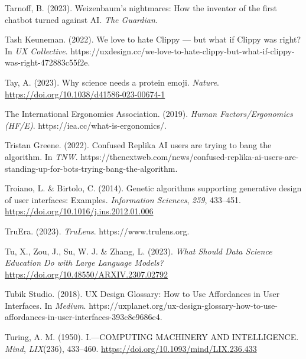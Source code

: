 \documentclass[
  letterpaper,
  DIV=11,
  numbers=noendperiod]{scrartcl}
\newlength{\cslhangindent}
\newenvironment{CSLReferences}[2] %
 {\begin{list}{}{%
  \setlength{\itemindent}{0pt}
  \setlength{\leftmargin}{0pt}
  \setlength{\parsep}{0pt}
  \ifodd #1
   \setlength{\leftmargin}{\cslhangindent}
   \setlength{\itemindent}{-1\cslhangindent}
  \fi
  \setlength{\itemsep}{#2\baselineskip}}}
 {\end{list}}
\begin{document}
\begin{CSLReferences}{1}{0}
Tarnoff, B. (2023). Weizenbaum's nightmares: How the inventor of the
first chatbot turned against {AI}. \emph{The Guardian}.

Tash Keuneman. (2022). We love to hate {Clippy} --- but what if {Clippy}
was right? In \emph{UX Collective}.
https://uxdesign.cc/we-love-to-hate-clippy-but-what-if-clippy-was-right-472883c55f2e.

Tay, A. (2023). Why science needs a protein emoji. \emph{Nature}.
\url{https://doi.org/10.1038/d41586-023-00674-1}

The International Ergonomics Association. (2019). \emph{Human
{Factors}/{Ergonomics} ({HF}/{E})}. https://iea.cc/what-is-ergonomics/.

Tristan Greene. (2022). Confused {Replika AI} users are trying to bang
the algorithm. In \emph{TNW}.
https://thenextweb.com/news/confused-replika-ai-users-are-standing-up-for-bots-trying-bang-the-algorithm.

Troiano, L. \& Birtolo, C. (2014). Genetic algorithms supporting
generative design of user interfaces: {Examples}. \emph{Information
Sciences}, \emph{259}, 433--451.
\url{https://doi.org/10.1016/j.ins.2012.01.006}

TruEra. (2023). \emph{{TruLens}}. https://www.trulens.org.

Tu, X., Zou, J., Su, W. J. \& Zhang, L. (2023). \emph{What {Should Data
Science Education Do} with {Large Language Models}?}
\url{https://doi.org/10.48550/ARXIV.2307.02792}

Tubik Studio. (2018). {UX Design Glossary}: {How} to {Use Affordances}
in {User Interfaces}. In \emph{Medium}.
https://uxplanet.org/ux-design-glossary-how-to-use-affordances-in-user-interfaces-393c8e9686e4.

Turing, A. M. (1950). I.---{COMPUTING MACHINERY AND INTELLIGENCE}.
\emph{Mind}, \emph{LIX}(236), 433--460.
\url{https://doi.org/10.1093/mind/LIX.236.433}


\end{CSLReferences}
\end{document}
